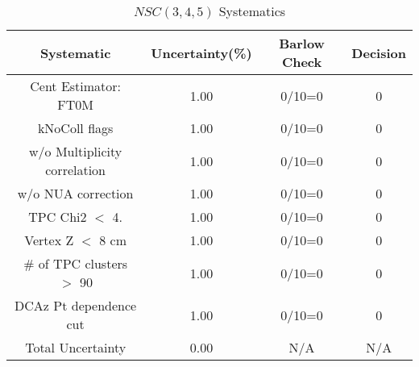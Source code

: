 \begin{table}[htbp]
\caption{$NSC(3,4,5)$ Systematics}
\label{tab:Sys_NSC345}
\centering
\begin{tabular}{|c|c|c|c|}
\hline
Systematic & Uncertainty(\%) & Barlow Check & Decision \\
\hline
Cent Estimator: FT0M & 1.00 & 0/10=0 & 0 \\
kNoColl flags & 1.00 & 0/10=0 & 0 \\
w/o Multiplicity correlation & 1.00 & 0/10=0 & 0 \\
w/o NUA correction & 1.00 & 0/10=0 & 0 \\
TPC Chi2 $<$ 4. & 1.00 & 0/10=0 & 0 \\
Vertex Z $<$ 8 cm & 1.00 & 0/10=0 & 0 \\
\# of TPC clusters $>$ 90 & 1.00 & 0/10=0 & 0 \\
DCAz Pt dependence cut & 1.00 & 0/10=0 & 0 \\
\hline
Total Uncertainty & 0.00 & N/A & N/A \\
\hline
\end{tabular}
\end{table}
